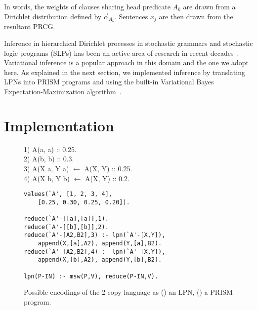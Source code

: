 \documentclass[11pt, twocolumn]{article}
\begin{document}
In words, the weights of clauses sharing head predicate $A_k$ are drawn from a Dirichlet distribution defined by $\vec{\alpha}_{A_k}$. Sentences $x_j$ are then drawn from the resultant PRCG.

Inference in hierarchical Dirichlet processes in stochastic grammars
and stochastic logic programs (SLPs) has been an active area of
research in recent decades~\cite{DBLP:conf/emnlp/LiangPJK07,
  goldwater2006contextual, johnson2006adaptor, cussens2001parameter}.
Variational inference is a popular approach in this domain and the one
we adopt here. As explained in the next section, we implemented
inference by translating LPNs into PRISM programs and using the
built-in Variational Bayes Expectation-Maximization
algorithm~\cite{sato2008variational}.

\section{Implementation}


\begin{figure}[t]
	\centering
	\begin{minipage}[b]{0.8\linewidth}
1) A(a, a) :: 0.25. \\
2) A(b, b) :: 0.3. \\
3) A(X a, Y a) $\leftarrow$ A(X, Y) :: 0.25. \\
4) A(X b, Y b) $\leftarrow$ A(X, Y) :: 0.2.
		\subcaption{}
		\label{fig:grammar}
	\end{minipage}
	\begin{minipage}[b]{0.8\linewidth}
        \fontsize{9}{10.5}\selectfont\ttfamily
		\begin{verbatim}
values(`A', [1, 2, 3, 4],
    [0.25, 0.30, 0.25, 0.20]).

reduce(`A'-[[a],[a]],1).
reduce(`A'-[[b],[b]],2).
reduce(`A'-[A2,B2],3) :- lpn(`A'-[X,Y]),
    append(X,[a],A2), append(Y,[a],B2).
reduce(`A'-[A2,B2],4) :- lpn(`A'-[X,Y]),
    append(X,[b],A2), append(Y,[b],B2).

lpn(P-IN) :- msw(P,V), reduce(P-IN,V).
		\end{verbatim}
		\subcaption{}
		\label{fig:prism}
	\end{minipage}
	\caption{Possible encodings of the 2-copy language as () an LPN, () a PRISM program.}
	\label{fig:copy}
\end{figure}
\end{document}

